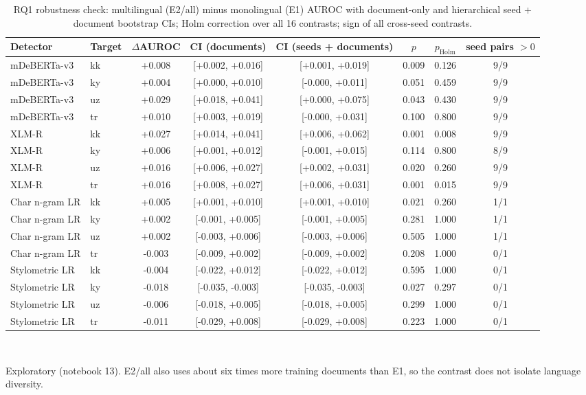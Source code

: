\begin{table}[t]
\centering
\small
\caption{RQ1 robustness check: multilingual (E2/all) minus monolingual (E1) AUROC with document-only and hierarchical seed + document bootstrap CIs; Holm correction over all 16 contrasts; sign of all cross-seed contrasts.}
\label{tab:rq1seed}
\begin{tabular}{llcccccc}
\toprule
Detector & Target & $\Delta$AUROC & CI (documents) & CI (seeds + documents) & $p$ & $p_{\mathrm{Holm}}$ & seed pairs $>0$ \\
\midrule
mDeBERTa-v3 & kk & +0.008 & [+0.002, +0.016] & [+0.001, +0.019] & 0.009 & 0.126 & 9/9 \\
mDeBERTa-v3 & ky & +0.004 & [+0.000, +0.010] & [-0.000, +0.011] & 0.051 & 0.459 & 9/9 \\
mDeBERTa-v3 & uz & +0.029 & [+0.018, +0.041] & [+0.000, +0.075] & 0.043 & 0.430 & 9/9 \\
mDeBERTa-v3 & tr & +0.010 & [+0.003, +0.019] & [-0.000, +0.031] & 0.100 & 0.800 & 9/9 \\
XLM-R & kk & +0.027 & [+0.014, +0.041] & [+0.006, +0.062] & 0.001 & 0.008 & 9/9 \\
XLM-R & ky & +0.006 & [+0.001, +0.012] & [-0.001, +0.015] & 0.114 & 0.800 & 8/9 \\
XLM-R & uz & +0.016 & [+0.006, +0.027] & [+0.002, +0.031] & 0.020 & 0.260 & 9/9 \\
XLM-R & tr & +0.016 & [+0.008, +0.027] & [+0.006, +0.031] & 0.001 & 0.015 & 9/9 \\
Char n-gram LR & kk & +0.005 & [+0.001, +0.010] & [+0.001, +0.010] & 0.021 & 0.260 & 1/1 \\
Char n-gram LR & ky & +0.002 & [-0.001, +0.005] & [-0.001, +0.005] & 0.281 & 1.000 & 1/1 \\
Char n-gram LR & uz & +0.002 & [-0.003, +0.006] & [-0.003, +0.006] & 0.505 & 1.000 & 1/1 \\
Char n-gram LR & tr & -0.003 & [-0.009, +0.002] & [-0.009, +0.002] & 0.208 & 1.000 & 0/1 \\
Stylometric LR & kk & -0.004 & [-0.022, +0.012] & [-0.022, +0.012] & 0.595 & 1.000 & 0/1 \\
Stylometric LR & ky & -0.018 & [-0.035, -0.003] & [-0.035, -0.003] & 0.027 & 0.297 & 0/1 \\
Stylometric LR & uz & -0.006 & [-0.018, +0.005] & [-0.018, +0.005] & 0.299 & 1.000 & 0/1 \\
Stylometric LR & tr & -0.011 & [-0.029, +0.008] & [-0.029, +0.008] & 0.223 & 1.000 & 0/1 \\
\bottomrule
\end{tabular}
\\[2pt]\parbox{\linewidth}{\footnotesize Exploratory (notebook 13). E2/all also uses about six times more training documents than E1, so the contrast does not isolate language diversity.}
\end{table}